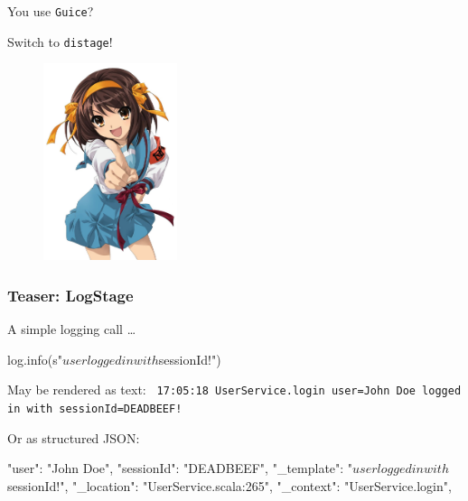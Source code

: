 \documentclass[usenames,dvipsnames]{beamer}
\newcommand{\distage}{\texttt{distage}\xspace}
\begin{document}
\begin{frame}
  \begin{center}
  \Huge
  You use \texttt{Guice}?

  Switch to \distage!

  \begin{figure}
      \includegraphics[width=0.35\textwidth]{media/haruhi.jpg}
  \end{figure}

  \end{center}
\end{frame}

\begin{frame}[fragile]
  \frametitle{Teaser: LogStage}
  A simple logging call \dots
  \begin{scalacode}
log.info(s"$user logged in with $sessionId!")
  \end{scalacode}

  May be rendered as text:
  \newline
  \texttt{
  17:05:18 UserService.login user=John Doe logged in with sessionId=DEADBEEF!
  }
  \newline

  Or as structured JSON:
  \begin{jsoncode}
{
  "user": "John Doe",
  "sessionId": "DEADBEEF",
  "_template": "$user logged in with $sessionId!",
  "_location": "UserService.scala:265",
  "_context": "UserService.login",
}
  \end{jsoncode}
\end{frame}
\end{document}
